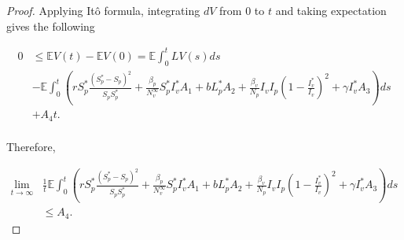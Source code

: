 \begin{proof}
	Applying It\^{o} formula, integrating $dV$ from $0$ to $t$ and taking expectation gives the following
	
	\begin{align*}
		0&
			\leq \mathbb{E}V(t)-\mathbb{E}V(0)=\mathbb{E}\int_{0}^{t}LV(s)ds\\
		&-\mathbb{E}\int_{0}^{t}\left(rS_p^*\frac{\left(S_p^*-S_p\right)^2}{S_pS_p^*}+\frac{\beta_p}{N^\infty_v}S_p^*I_v^*A_1+bL_p^*A_2+\frac{\beta_v}{N_p}I_vI_p\left(1-\frac{I_v^*}{I_v}\right)^2+\gamma I_v^* A_3\right)ds\\
		&+
			A_4t.\\
	\end{align*}
	
	Therefore,
	
	\begin{align*}
	\lim\limits_{t\rightarrow \infty}&\frac{1}{t}\mathbb{E}\int_{0}^{t}\left(rS_p^*\frac{\left(S_p^*-S_p\right)^2}{S_pS_p^*}+\frac{\beta_p}{N^\infty_v}S_p^*I_v^*A_1+bL_p^*A_2+\frac{\beta_v}{N_p}I_vI_p\left(1-\frac{I_v^*}{I_v}\right)^2+\gamma I_v^* A_3\right)ds\\
	&\leq
	A_4.
	\end{align*}
\end{proof}